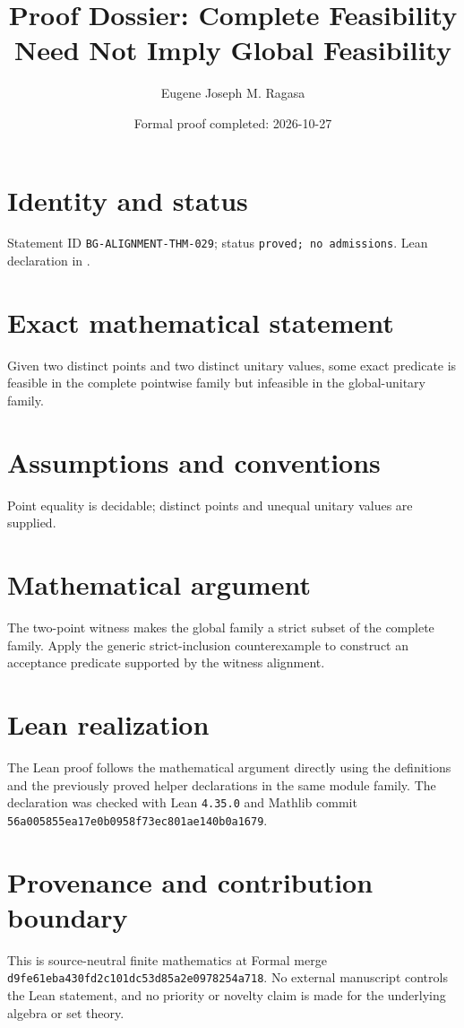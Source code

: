 \documentclass[11pt]{article}
\title{Proof Dossier: Complete Feasibility Need Not Imply Global Feasibility}
\author{Eugene Joseph M. Ragasa}
\date{Formal proof completed: 2026-10-27}
\begin{document}
\raggedright
\maketitle

\section{Identity and status}
Statement ID \texttt{BG-ALIGNMENT-THM-029}; status \texttt{proved; no admissions}.  Lean declaration
 in
.

\section{Exact mathematical statement}
Given two distinct points and two distinct unitary values, some exact predicate is feasible in the complete pointwise family but infeasible in the global-unitary family.

\section{Assumptions and conventions}
Point equality is decidable; distinct points and unequal unitary values are supplied.

\section{Mathematical argument}
The two-point witness makes the global family a strict subset of the complete family.  Apply the generic strict-inclusion counterexample to construct an acceptance predicate supported by the witness alignment.

\section{Lean realization}
The Lean proof follows the mathematical argument directly using the definitions and the
previously proved helper declarations in the same module family.  The declaration was checked
with Lean \texttt{4.35.0} and Mathlib commit \texttt{56a005855ea17e0b0958f73ec801ae140b0a1679}.

\section{Provenance and contribution boundary}
This is source-neutral finite mathematics at Formal merge
\texttt{d9fe61eba430fd2c101dc53d85a2e0978254a718}.  No external manuscript controls the Lean statement, and no priority or
novelty claim is made for the underlying algebra or set theory.
\end{document}
